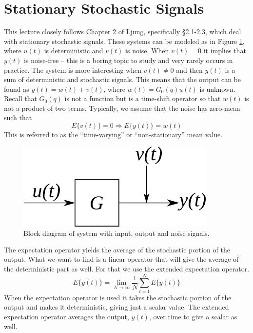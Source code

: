 
\mainmatter
\setcounter{page}{1}

\lectureseries[\course]{\course}

\date{October 6, 2009}

\setaddress

\setcounter{lecture}{3}
\setcounter{chapter}{3}


\section{Stationary Stochastic Signals}
This lecture closely follows Chapter 2 of Ljung, specifically \S2.1-2.3, which deal with stationary stochastic signals. These systems can be modeled as in Figure \ref{fig:04system}, where $u(t)$ is deterministic and $v(t)$ is noise. When $v(t)=0$ it implies that $y(t)$ is noise-free -- this is a boring topic to study and very rarely occurs in practice. The system is more interesting when $v(t)\neq 0$ and then $y(t)$ is a sum of deterministic and stochastic signals. This means that the output can be found as $y(t)=w(t)+v(t)$, where $w(t)=G_0(q)u(t)$ is unknown. Recall that $G_0(q)$ is not a function but is a time-shift operator so that $w(t)$ is not a product of two terms. Typically, we assume that the noise has zero-mean such that
$$E\{v(t)\}=0 \Rightarrow E\{y(t)\}=w(t)$$
This is referred to as the ``time-varying'' or ``non-stationary'' mean value.
\begin{figure}[ht!]
	\centering
	\includegraphics[width=.3\textwidth]{images/04system}
	\caption{Block diagram of system with input, output and noise signals.}
	\label{fig:04system}
\end{figure}

The expectation operator yields the average of the stochastic portion of the output. What we want to find is a linear operator that will give the average of the deterministic part as well. For that we use the extended expectation operator.
$$\bar{E}\{y(t)\} = \lim_{N\to\infty}\frac{1}{N}\sum_{t=1}^NE\{y(t)\}$$
When the expectation operator is used it takes the stochastic portion of the output and makes it deterministic, giving just a scalar value. The extended expectation operator averages the output, $y(t)$, over time to give a scalar as well.

